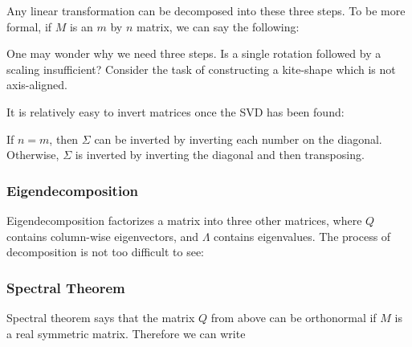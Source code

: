 \documentclass[12pt]{article}
\begin{document}
Any linear transformation can be decomposed into these three steps. To be more formal, if $M$ is an $m$ by $n$ matrix, we can say the following:


One may wonder why we need three steps. Is a single rotation followed by a scaling insufficient? Consider the task of constructing a kite-shape which is not axis-aligned.

It is relatively easy to invert matrices once the SVD has been found:


If $n = m$, then $\Sigma$ can be inverted by inverting each number on the diagonal. Otherwise, $\Sigma$ is inverted by inverting the diagonal and then transposing.

\subsubsection{Eigendecomposition}


Eigendecomposition factorizes a matrix into three other matrices, where $Q$ contains column-wise eigenvectors, and $\Lambda$ contains eigenvalues. The process of decomposition is not too difficult to see:


\subsubsection{Spectral Theorem}

Spectral theorem says that the matrix $Q$ from above can be orthonormal if $M$ is a real symmetric matrix. Therefore we can write

\end{document}
